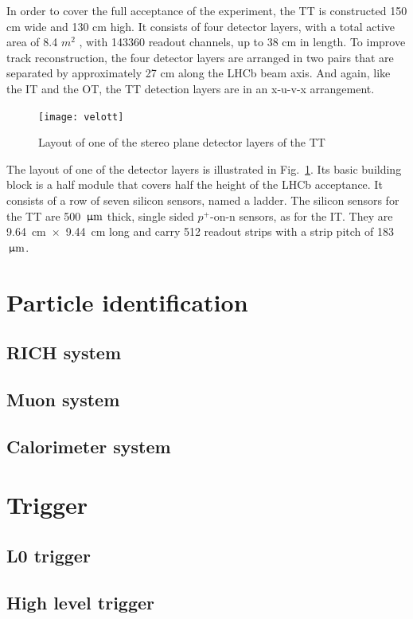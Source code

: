 In order to cover the full acceptance of the experiment, the TT is constructed 150 cm
wide and 130 cm high. It consists of four detector layers, with a total active
area of 8.4 $m^2$ , with 143360 readout channels, up to 38 cm in length. 
To improve track reconstruction, the four detector layers are arranged in two
pairs that are separated by approximately 27 cm along the LHCb beam axis.
And again, like the IT and the OT, the TT detection layers are in an x-u-v-x arrangement.

\begin{figure}[tb]
\begin{center}
\texttt{[image: velott]}
\end{center}
\caption{\small Layout of one of the stereo plane detector layers of the TT}
\label{fig:velott}
\end{figure}


The layout of one of the detector layers is illustrated in Fig.~\ref{fig:velott}.
Its basic building block is a half module that covers half the height of the
LHCb acceptance. It consists of a row of seven silicon sensors, named a ladder.
The silicon sensors for the TT are 500 $\,\upmu\rm m$ thick, single sided $p^+$-on-n
sensors, as for the IT. They are 9.64~cm~$\times$~9.44~cm long and carry 512
readout strips with a strip pitch of 183 $\,\upmu\rm m$.
    



\section{Particle identification}
\subsection{RICH system}
\subsection{Muon system}
\subsection{Calorimeter system}

\section{Trigger}
\subsection{L0 trigger}
\subsection{High level trigger}